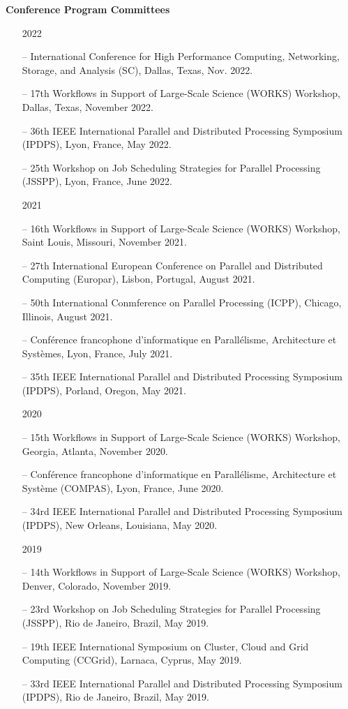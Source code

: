 \documentclass[times,11pt]{letter}
\begin{document}
\noindent
{\bf Conference Program Committees}
\begin{itemize}

\item [2022]
\item[--]  International Conference for High Performance Computing, Networking, Storage, and Analysis (SC), Dallas, Texas, Nov. 2022.
\item[--]  17th Workflows in Support of Large-Scale Science (WORKS) Workshop, Dallas, Texas,  November 2022.
\item [--] 36th IEEE International Parallel and Distributed Processing Symposium (IPDPS), Lyon, France, May 2022.
\item[--]  25th Workshop on Job Scheduling Strategies for Parallel Processing (JSSPP), Lyon, France, June 2022.

\item [2021]
\item[--]  16th Workflows in Support of Large-Scale Science (WORKS) Workshop, Saint Louis, Missouri,  November 2021.
\item [--] 27th International European Conference on Parallel and Distributed Computing (Europar), Lisbon, Portugal, August 2021.
\item [--] 50th International Conmference on Parallel Processing  (ICPP), Chicago, Illinois, August 2021.
\item [--] Conf\'erence francophone d'informatique en Parall\'elisme, Architecture et Syst\`emes, Lyon, France, July 2021.
\item [--] 35th IEEE International Parallel and Distributed Processing Symposium (IPDPS), Porland, Oregon, May 2021.

\item [2020]
\item[--]  15th Workflows in Support of Large-Scale Science (WORKS) Workshop, Georgia, Atlanta, November 2020.
\item [--] Conf\'erence francophone d'informatique en Parall\'elisme, Architecture et Syst\`eme (COMPAS), Lyon, France, June 2020.
\item [--] 34rd IEEE International Parallel and Distributed Processing Symposium (IPDPS), New Orleans, Louisiana, May 2020.

\item [2019]
\item[--]  14th Workflows in Support of Large-Scale Science (WORKS) Workshop, Denver, Colorado, November 2019.
\item[--]  23rd Workshop on Job Scheduling Strategies for Parallel Processing (JSSPP), Rio de Janeiro, Brazil, May 2019.
\item[--]  19th IEEE International Symposium on Cluster, Cloud and Grid Computing (CCGrid), Larnaca, Cyprus, May 2019.
\item[--]  33rd IEEE International Parallel and Distributed Processing Symposium (IPDPS), Rio de Janeiro, Brazil, May 2019.


\end{itemize}
\end{document}
